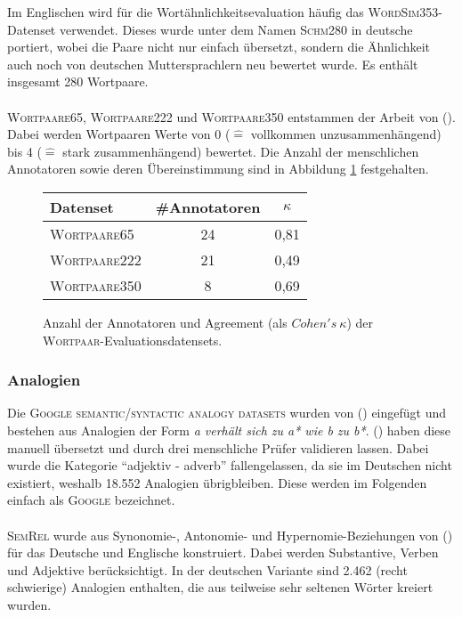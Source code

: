     Im Englischen wird für die Wortähnlichkeitsevaluation häufig das \textsc{WordSim353}-Datenset verwendet. Dieses
    wurde unter dem Namen \textsc{Schm280} in deutsche portiert, wobei die Paare nicht nur einfach übersetzt, sondern die
    Ähnlichkeit auch noch von deutschen Muttersprachlern neu bewertet wurde. Es enthält insgesamt 280 Wortpaare.\\ \\
    \textsc{Wortpaare65}, \textsc{Wortpaare222} und \textsc{Wortpaare350} entstammen der Arbeit von (\cite{rubenstein1965contextual}). Dabei werden Wortpaaren
    Werte von 0 ($\hat{=}$ vollkommen unzusammenhängend) bis 4 ($\hat{=}$ stark zusammenhängend) bewertet. Die Anzahl
    der menschlichen Annotatoren sowie deren Übereinstimmung sind in Abbildung \ref{fig:evalsets} festgehalten.

    \begin{figure}[h]
      \centering
      \begin{tabular}{l|cc}
        Datenset & \#Annotatoren & $\kappa$ \\
        \hline
        \textsc{Wortpaare65} & 24 & 0,81 \\
        \textsc{Wortpaare222} & 21 & 0,49 \\
        \textsc{Wortpaare350} & 8 & 0,69 \\
      \end{tabular}
      \caption{Anzahl der Annotatoren und Agreement (als $Cohen's\ \kappa$) der \textsc{Wortpaar}-Evaluationsdatensets.
      \label{fig:evalsets}}
    \end{figure}

    \subsubsection{Analogien}

    Die \textsc{Google semantic/syntactic analogy datasets} wurden von (\cite{mikolov2013efficient}) eingefügt und bestehen
    aus Analogien der Form \emph{a verhält sich zu a* wie b zu b*}. (\cite{koper2015multilingual}) haben diese manuell übersetzt und durch
    drei menschliche Prüfer validieren lassen. Dabei wurde die Kategorie ``adjektiv - adverb'' fallengelassen, da sie
    im Deutschen nicht existiert, weshalb 18.552 Analogien übrigbleiben. Diese werden im Folgenden einfach als
    \textsc{Google} bezeichnet.\\ \\
    \textsc{SemRel} wurde aus Synonomie-, Antonomie- und Hypernomie-Beziehungen von (\cite{koper2015multilingual}) für das Deutsche und Englische
    konstruiert. Dabei werden Substantive, Verben und Adjektive berücksichtigt. In der deutschen Variante sind 2.462 (recht schwierige) Analogien enthalten,
    die aus teilweise sehr seltenen Wörter kreiert wurden.

